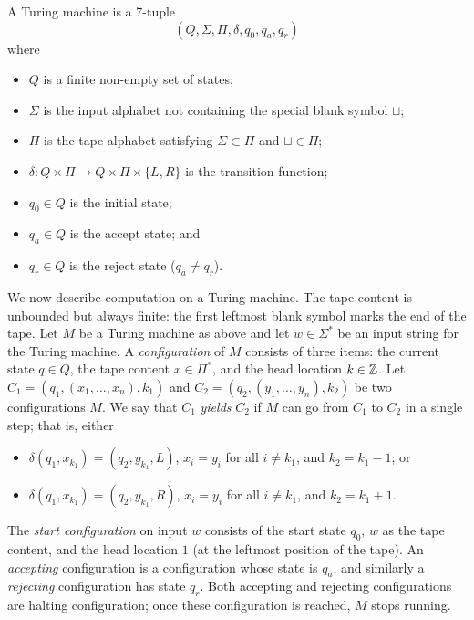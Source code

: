 \begin{definition}
  A Turing machine is a 7-tuple \[(Q, \Sigma, \Pi, \delta, q_0, q_a, q_r)\] where
  \begin{itemize}
    \item $Q$ is a finite non-empty set of states;
    \item $\Sigma$ is the input alphabet not containing the special blank symbol $\sqcup$;
    \item $\Pi$ is the tape alphabet satisfying $\Sigma \subset \Pi$ and $\sqcup \in \Pi$;
    \item $\delta: Q \times \Pi \to Q \times \Pi \times \{L, R\}$ is the transition function;
    \item $q_0 \in Q$ is the initial state;
    \item $q_a \in Q$ is the accept state; and
    \item $q_r \in Q$ is the reject state ($q_a \neq q_r$).
  \end{itemize}
\end{definition}


We now describe computation on a Turing machine. The tape content is unbounded but always finite: the first leftmost blank symbol marks the end of the tape. Let $M$ be a Turing machine as above and let $w \in \Sigma^*$ be an input string for the Turing machine. A \emph{configuration} of $M$ consists of three items: the current state $q \in Q$, the tape content $x \in \Pi^*$, and the head location $k \in \mathbb Z$. Let $C_1 = (q_1, (x_1, \ldots, x_n), k_1)$ and $C_2 = (q_2, (y_1, \ldots, y_n), k_2)$ be two configurations $M$. We say that $C_1$ \emph{yields} $C_2$ if $M$ can go from $C_1$ to $C_2$ in a single step; that is, either
\begin{itemize}
  \item $\delta(q_1, x_{k_1}) = (q_2, y_{k_1}, L)$, $x_i = y_i$ for all $i \neq k_1$, and $k_2 = k_1 - 1$; or
  \item $\delta(q_1, x_{k_1}) = (q_2, y_{k_1}, R)$, $x_i = y_i$ for all $i \neq k_1$, and $k_2 = k_1 + 1$.
\end{itemize}
The \emph{start configuration} on input $w$ consists of the start state $q_0$, $w$ as the tape content, and the head location $1$ (at the leftmost position of the tape). An \emph{accepting} configuration is a configuration whose state is $q_a$, and similarly a \emph{rejecting} configuration has state $q_r$. Both accepting and rejecting configurations are halting configuration; once these configuration is reached, $M$ stops running.

